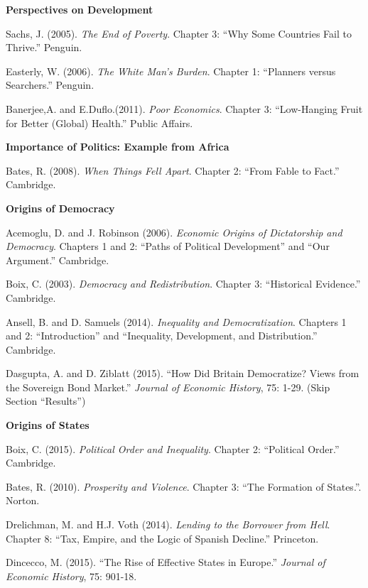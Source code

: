 \documentclass[letterpaper]{article}
\renewenvironment{itemize}{
  \begin{list}{}{
    \setlength{\leftmargin}{1.5em}
  }
}{
  \end{list}
}
\begin{document}
\begin{enumerate}

\item {\bf Perspectives on Development}
	\begin{itemize}
		\item[$\bullet$] Sachs, J. (2005). \emph{The End of Poverty}. Chapter 3: ``Why Some Countries Fail to Thrive.'' Penguin.
		\item[$\bullet$] Easterly, W. (2006). \emph{The White Man's Burden}. Chapter 1: ``Planners versus Searchers.'' Penguin.
		\item[$\bullet$] Banerjee,A. and E.Duflo.(2011). \emph{Poor Economics}. Chapter 3: ``Low-Hanging Fruit for Better (Global) Health.'' Public Affairs.
	\end{itemize}


\item {\bf Importance of Politics: Example from Africa}
	\begin{itemize}
		\item[$\bullet$] Bates, R. (2008). \emph{When Things Fell Apart}. Chapter 2: ``From Fable to Fact.'' Cambridge.
	\end{itemize}


\item {\bf Origins of Democracy}
	\begin{itemize}
		\item[$\bullet$] Acemoglu, D. and J. Robinson (2006). \emph{Economic Origins of Dictatorship and Democracy}. Chapters 1 and 2: ``Paths of Political Development'' and ``Our Argument.'' Cambridge.
		\item[$\bullet$] Boix, C. (2003). \emph{Democracy and Redistribution}. Chapter 3: ``Historical Evidence.'' Cambridge.
		\item[$\bullet$] Ansell, B. and D. Samuels (2014). \emph{Inequality and Democratization}. Chapters 1 and 2: ``Introduction'' and ``Inequality, Development, and Distribution.'' Cambridge.
		\item[$\bullet$] Dasgupta, A. and D. Ziblatt (2015). ``How Did Britain Democratize? Views from the Sovereign Bond Market.'' \emph{Journal of Economic History}, 75: 1-29. (Skip Section “Results”)
	\end{itemize}


\item {\bf Origins of States}
	\begin{itemize}
		\item[$\bullet$] Boix, C. (2015). \emph{Political Order and Inequality}. Chapter 2: ``Political Order.'' Cambridge.
		\item[$\bullet$] Bates, R. (2010). \emph{Prosperity and Violence}. Chapter 3: ``The Formation of States.''. Norton.
		\item[$\bullet$] Drelichman, M. and H.J. Voth (2014). \emph{Lending to the Borrower from Hell}. Chapter 8: ``Tax, Empire, and the Logic of Spanish Decline.'' Princeton.
		\item[$\bullet$] Dincecco, M. (2015). ``The Rise of Effective States in Europe.'' \emph{Journal of Economic History}, 75: 901-18.
	\end{itemize}



\end{enumerate}
\end{document}
